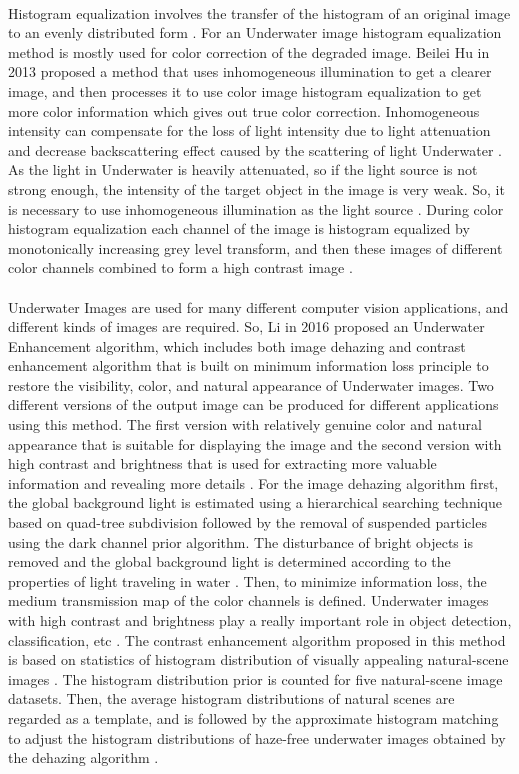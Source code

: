 \documentclass[a4paper,11pt,oneside]{article}
\begin{document}
  \\
  Histogram equalization involves the transfer of the histogram of an original image to an evenly distributed form \cite{1}. For an Underwater image histogram equalization method is mostly used for color correction of the degraded image. Beilei Hu \cite{1} in 2013 proposed a method that uses inhomogeneous illumination to get a clearer image, and then processes it to use color image histogram equalization to get more color information which gives out true color correction. Inhomogeneous intensity can compensate for the loss of light intensity due to light attenuation and decrease backscattering effect caused by the scattering of light Underwater \cite{1}. As the light in Underwater is heavily attenuated, so if the light source is not strong enough, the intensity of the target object in the image is very weak. So, it is necessary to use inhomogeneous illumination as the light source \cite{1}. During color histogram equalization each channel of the image is histogram equalized by monotonically increasing grey level transform, and then these images of different color channels combined to form a high contrast image \cite{1}.\\
  \\
   Underwater Images are used for many different computer vision applications, and different kinds of images are required. So, Li in 2016 \cite{21} proposed an Underwater Enhancement algorithm, which includes both image dehazing and contrast enhancement algorithm that is built on minimum information loss principle to restore the visibility, color, and natural appearance of Underwater images. Two different versions of the output image can be produced for different applications using this method. The first version with relatively genuine color and natural appearance that is suitable for displaying the image and the second version with high contrast and brightness that is used for extracting more valuable information and revealing more details \cite{21}. For the image dehazing algorithm first, the global background light is estimated using a hierarchical searching technique based on quad-tree subdivision followed by the removal of suspended particles using the dark channel prior algorithm. The disturbance of bright objects is removed and the global background light is determined according to the properties of light traveling in water \cite{21}. Then, to minimize information loss, the medium transmission map of the color channels is defined. Underwater images with high contrast and brightness play a really important role in object detection, classification, etc \cite{21}. The contrast enhancement algorithm proposed in this method is based on statistics of histogram distribution of visually appealing natural-scene images \cite{21}. The histogram distribution prior is counted for five natural-scene image datasets. Then, the average histogram distributions of natural scenes are regarded as a template, and is followed by the approximate histogram matching to adjust the histogram distributions of haze-free underwater images obtained by the dehazing algorithm \cite{21}.\\
\end{document}
